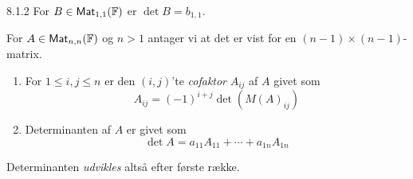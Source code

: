 \begin{definition}{8.1.2}
	For $B \in \textsf{Mat}_{1,1}(\mathbb{F})$ er $\det{B} = b_{1,1}$.

	\noindent
	For $A \in \textsf{Mat}_{n,n}(\mathbb{F})$ og $n > 1$ antager vi at det er vist for
	en $(n-1)\times(n-1)$-matrix.
	\begin{enumerate}
		\item For $1 \le i,j\le n$ er den $(i,j)$'te \emph{cofaktor} $A_{ij}$
			af $A$ givet som
			\[
				A_{ij}= (-1)^{i+j}\det(M(A)_{ij})
			\]
		\item Determinanten af $A$ er givet som
			\[
				\det A = a_{11}A_{11}+\dotsb+a_{1n}A_{1n}
			\]
	\end{enumerate}
	Determinanten \emph{udvikles} altså efter første række.
\end{definition}
